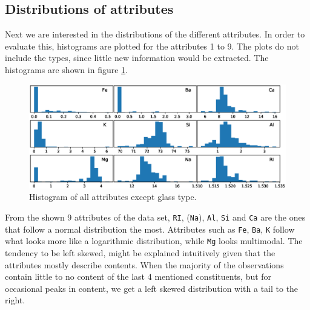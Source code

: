 \subsection{Distributions of attributes}
Next we are interested in the distributions of the different attributes. In order to evaluate this, histograms are plotted for the attributes 1 to 9. The plots do not include the types, since little new information would be extracted. The histograms are shown in figure \ref{fig:histograms}.

\begin{figure}[H]
\centering
\includegraphics[width=1\linewidth]{fig/HistogramAll.eps} 
\caption{Histogram of all attributes except glass type.}
\label{fig:histograms}
\end{figure}

From the shown 9 attributes of the data set, \texttt{RI}, (\texttt{Na}), \texttt{Al}, \texttt{Si} and \texttt{Ca} are the ones that follow a normal distribution the most. Attributes such as \texttt{Fe}, \texttt{Ba}, \texttt{K} follow what looks more like a logarithmic distribution, while \texttt{Mg} looks multimodal. The tendency to be left skewed, might be explained intuitively given that the attributes mostly describe contents. When the majority of the observations contain little to no content of the last 4 mentioned constituents, but for occasional peaks in content, we get a left skewed distribution with a tail to the right.
